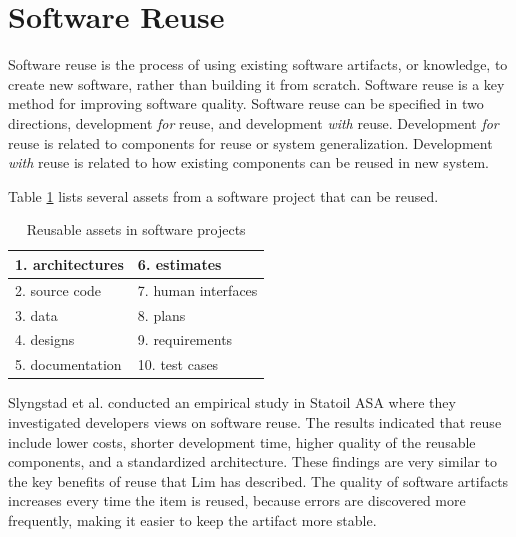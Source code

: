 

\section{Software Reuse}
\label{sec:2-SR}
Software reuse is the process of using existing software artifacts, or knowledge, to create new software, rather than building it from scratch. Software reuse is a key method for improving software quality\cite{frakes1996software}. Software reuse can be specified in two directions, development \textit{for} reuse, and development \textit{with} reuse\cite{Slyngstad:2006:ESD:1159733.1159770}. Development \textit{for} reuse is related to components for reuse or system generalization. Development \textit{with} reuse is related to how existing components can be reused in new system.

Table \ref{tab:reusableComponents} lists several assets from a software project that can be reused\cite{frakes1996software}.
\begin{table}[H]
	\centering
	\begin{tabular}{ | l | l |}
	\hline
	1. architectures & 6. estimates \\ \hline
	2. source code & 7. human interfaces \\ \hline
	3. data & 8. plans \\ \hline
	4. designs & 9. requirements \\ \hline
	5. documentation & 10. test cases \\
	\hline
	\end{tabular}
	\caption{Reusable assets in software projects} \label{tab:reusableComponents}
\end{table}

Slyngstad et al.\cite{Slyngstad:2006:ESD:1159733.1159770} conducted an empirical study in Statoil ASA where they investigated developers views on software reuse. The results indicated that reuse include lower costs, shorter development time, higher quality of the reusable components, and a standardized architecture. These findings are very similar to the key benefits of reuse that Lim has described\cite{lim1994effects}. The quality of software artifacts increases every time the item is reused, because errors are discovered more frequently, making it easier to keep the artifact more stable\cite{sametinger1997software}.


